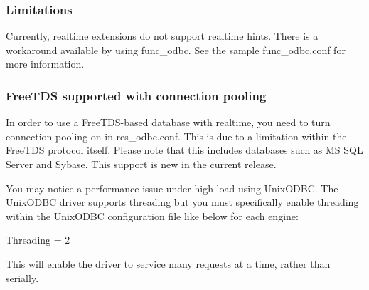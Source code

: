 \subsubsection{Limitations}

Currently, realtime extensions do not support realtime hints.  There is
a workaround available by using func\_odbc.  See the sample func\_odbc.conf
for more information.

\subsubsection{FreeTDS supported with connection pooling}

In order to use a FreeTDS-based database with realtime, you need to turn
connection pooling on in res\_odbc.conf.  This is due to a limitation within
the FreeTDS protocol itself.  Please note that this includes databases such
as MS SQL Server and Sybase.  This support is new in the current release.

You may notice a performance issue under high load using UnixODBC. The UnixODBC
driver supports threading but you must specifically enable threading within the
UnixODBC configuration file like below for each engine:

	Threading = 2

This will enable the driver to service many requests at a time, rather than
serially.
